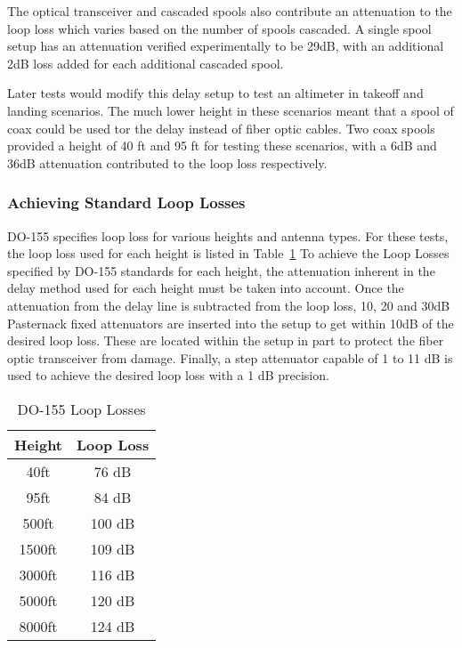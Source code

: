  The optical transceiver and cascaded spools also contribute an attenuation to the loop loss which varies based on the number of spools cascaded. A single spool setup has an attenuation verified experimentally to be 29dB, with an additional 2dB loss added for each additional cascaded spool.

Later tests would modify this delay setup to test an altimeter in takeoff and landing scenarios. The much lower height in these scenarios meant that a spool of coax could be used tor the delay instead of fiber optic cables. Two coax spools provided a height of 40 ft and 95 ft for testing these scenarios, with a 6dB and 36dB attenuation contributed to the loop loss respectively.  

\subsubsection{Achieving Standard Loop Losses}
DO-155 specifies loop loss for various heights and antenna types. For these tests, the loop loss used for each height is listed in Table~\ref{tab:loop loss} To achieve the Loop Losses specified by DO-155 standards for each height, the attenuation inherent in the delay method used for each height must be taken into account. Once the attenuation from the delay line is subtracted from the loop loss, 10, 20 and 30dB Pasternack fixed attenuators are inserted into the setup to get within 10dB of the desired loop loss. These are located within the setup in part to protect the fiber optic transceiver from damage.  Finally, a step attenuator capable of 1 to 11 dB is used to achieve the desired loop loss with a 1 dB precision. 

\begin{table}[]
\centering
\begin{tabular}{|c|c|}
\hline
\textbf{Height} & \textbf{Loop Loss} \\ \hline
40ft            & 76 dB              \\ \hline
95ft            & 84 dB              \\ \hline
500ft           & 100 dB             \\ \hline
1500ft          & 109 dB             \\ \hline
3000ft          & 116 dB             \\ \hline
5000ft          & 120 dB             \\ \hline
8000ft          & 124 dB             \\ \hline
\end{tabular}
\caption{DO-155 Loop Losses}
\label{tab:loop loss}
\end{table}

